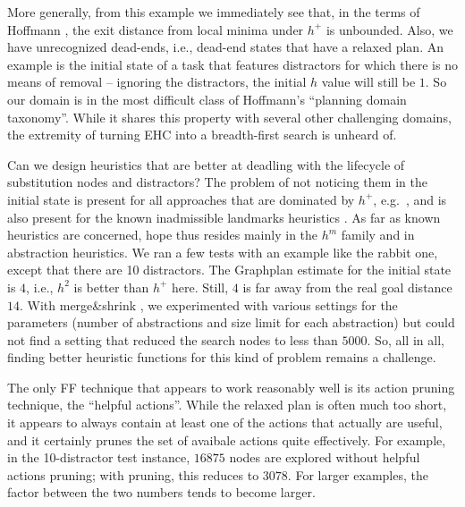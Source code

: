 More generally, from this example we immediately see that, in the
terms of Hoffmann , the exit distance from
local minima under $h^+$ is unbounded. Also, we have unrecognized
dead-ends, i.e., dead-end states that have a relaxed plan. An example
is the initial state of a task that features distractors for which
there is no means of removal -- ignoring the distractors, the initial
$h$ value will still be $1$. So our domain is in the most difficult
class of Hoffmann's  ``planning domain
taxonomy''. While it shares this property with several other
challenging domains, the extremity of turning EHC into a breadth-first
search is unheard of.


Can we design heuristics that are better at deadling with the
lifecycle of substitution nodes and distractors? The problem of not
noticing them in the initial state is present for all approaches that
are dominated by $h^+$,
e.g.\ \cite{karpas:domshlak-ijcai-09,helmert:domshlak:icaps-09}, and
is also present for the known inadmissible landmarks heuristics
\cite{richter:etal:aaai-08}. As far as known heuristics are concerned,
hope thus resides mainly in the $h^m$ family and in abstraction
heuristics. We ran a few tests with an example like the rabbit one,
except that there are 10 distractors. The Graphplan estimate for the
initial state is $4$, i.e., $h^2$ is better than $h^+$ here. Still,
$4$ is far away from the real goal distance $14$. %
With merge\&shrink \cite{helmert:etal:icaps07}, we experimented with
various settings for the parameters (number of abstractions and size
limit for each abstraction) but could not find a setting that reduced
the search nodes to less than $5000$. So, all in all, finding better
heuristic functions for this kind of problem remains a challenge.







The only FF technique that appears to work reasonably well is its
action pruning technique, the ``helpful actions''. While the relaxed
plan is often much too short, it appears to always contain at least
one of the actions that actually are useful, and it certainly prunes
the set of avaibale actions quite effectively. For example, in the
10-distractor test instance, $16875$ nodes are explored without
helpful actions pruning; with pruning, this reduces to $3078$. For
larger examples, the factor between the two numbers tends to become
larger. %



